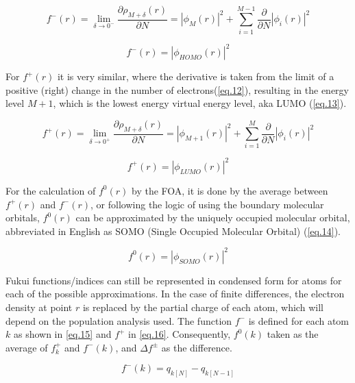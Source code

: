 \documentclass[a4paper,11pt]{refart}
\begin{document}
	\begin{equation}
	f^{-}(r) = \lim_{\delta \to 0^-} \frac{\partial \rho_{M+\delta}(r)}{\partial N} = |\phi_{M}(r)|^2  +\sum_{i=1}^{M-1} \frac{\partial}{\partial N} |\phi_i(r)|^2
	\label{eq.10}
	\end{equation}

	\begin{equation}
	f^{-}(r) = |\phi_{HOMO}(r)|^2 
	\label{eq.11}
	\end{equation}

	For $f^{+}(r)$ it is very similar, where the derivative is taken from the limit of a positive (right) change in the number of electrons(\autoref{eq.12}), resulting in the energy level $ M+1$, which is the lowest energy virtual energy level, aka LUMO (\autoref{eq.13}).

	\begin{equation}
	f^{+}(r) = \lim_{\delta \to 0^+} \frac{\partial \rho_{M+\delta}(r)}{\partial N}	 =  |\phi_{M+1}(r)|^2  + \sum_{i=1}^{M} \frac{\partial}{\partial N} |\phi_i(r)|^2
	\label{eq.12}
	\end{equation}

	\begin{equation}
	f^{+}(r) = |\phi_{LUMO}(r)|^2 
	\label{eq.13}
	\end{equation}

	For the calculation of $f^{0}(r)$ by the FOA, it is done by the average between $f^{+}(r)$ and $f^{-}(r)$, or following the logic of using the boundary molecular orbitals, $f^{0}(r)$ can be approximated by the uniquely occupied molecular orbital, abbreviated in English as SOMO (Single Occupied Molecular Orbital) (\autoref{eq.14}).

	\begin{equation}
	f^{0}(r) = |\phi_{SOMO}(r)|^2 
	\label{eq.14}
	\end{equation}

	Fukui functions/indices can still be represented in condensed form for atoms for each of the possible approximations. In the case of finite differences, the electron density at point $r$ is replaced by the partial charge of each atom, which will depend on the population analysis used. The function $f^{-}$ is defined for each atom $k$ as shown in \autoref{eq.15} and $f^{+}$ in \autoref{eq.16}. Consequently, $f^{0}(k)$ taken as the average of $f^{+}_k$ and $f^{-}(k)$, and $\Delta f^{\pm}$ as the difference.

	\begin{equation}
	f^{-}(k) = q_{k [N]} - q_{k [N-1]}
	\label{eq.15}
	\end{equation}
\end{document}
